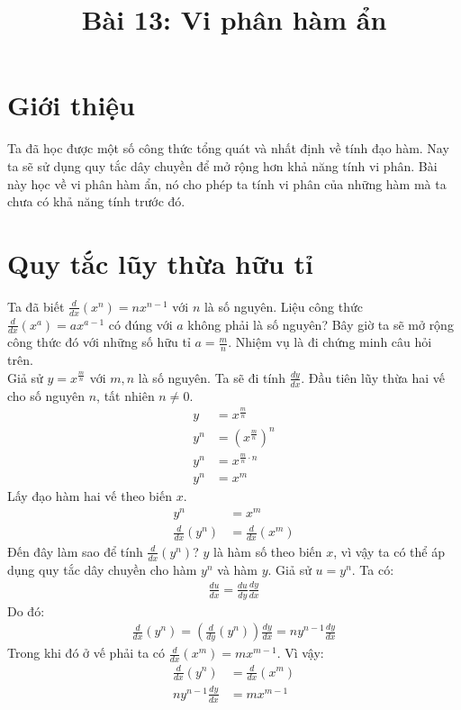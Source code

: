\documentclass[12pt,a4paper]{article}
\begin{document}
\title{\textbf{Bài 13: Vi phân hàm ẩn}}
\author{}
\date{}
\maketitle

\section{Giới thiệu}
Ta đã học được một số công thức tổng quát và nhất định về tính đạo hàm. Nay ta sẽ sử dụng quy tắc dây chuyền để mở rộng hơn khả năng tính vi phân. Bài này học về vi phân hàm ẩn, nó cho phép ta tính vi phân của những hàm mà ta chưa có khả năng tính trước đó.
\section{Quy tắc lũy thừa hữu tỉ}
Ta đã biết $\frac{d}{dx}(x^n)= n x^{n-1}$ với $n$ là số nguyên. Liệu công thức $\frac{d}{dx}(x^a)= ax^{a-1}$ có đúng với $a$ không phải là số nguyên? Bây giờ ta sẽ mở rộng công thức đó với những số hữu tỉ $a = \frac{m}{n}$. Nhiệm vụ là đi chứng minh câu hỏi trên.\\
Giả sử $y = x^{\frac{m}{n}}$ với $m, n$ là số nguyên. Ta sẽ đi tính $\frac{dy}{dx}$. Đầu tiên lũy thừa hai vế cho số nguyên $n$, tất nhiên $n \neq 0$.
\begin{align*}
	y &= x^{\frac{m}{n}}\\
	y^n &= (x^{\frac{m}{n}})^n\\
	y^n &= x^{\frac{m}{n} \cdot n}\\
	y^n &= x^m
\end{align*}
Lấy đạo hàm hai vế theo biến $x$.
\begin{align*}
	y^n &= x^m\\
	\frac{d}{dx}(y^n) &= \frac{d}{dx}(x^m)
\end{align*}
Đến đây làm sao để tính $\frac{d}{dx}(y^n)$? $y$ là hàm số theo biến $x$, vì vậy ta có thể áp dụng quy tắc dây chuyền cho hàm $y^n$ và hàm $y$. Giả sử $u = y^n$. Ta có:
\begin{align*}
	\frac{du}{dx} = \frac{du}{dy} \frac{dy}{dx}
\end{align*}
Do đó:
\begin{align*}
	\frac{d}{dx}(y^n) = \left(\frac{d}{dy}(y^n)\right) \frac{dy}{dx} = n y^{n-1} \frac{dy}{dx}
\end{align*}
Trong khi đó ở vế phải ta có $\frac{d}{dx}(x^m) = m x^{m-1}$. Vì vậy:
\begin{align*}
	\frac{d}{dx}(y^n) &= \frac{d}{dx}(x^m)\\
	n y^{n-1} \frac{dy}{dx} &= m x^{m-1}
\end{align*}
\end{document}
